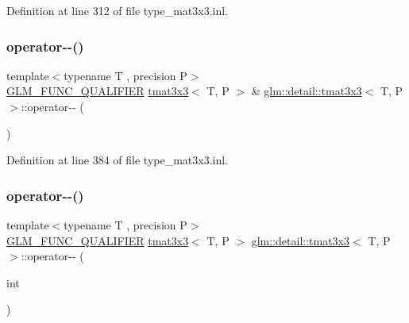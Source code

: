 Definition at line 312 of file type\+\_\+mat3x3.\+inl.

\mbox{\label{structglm_1_1detail_1_1tmat3x3_a00ca964c42c36a5472103aa3a9b375fc}} 
\subsubsection{\texorpdfstring{operator-\/-\/()}{operator--()}\hspace{0.1cm}{\footnotesize\ttfamily [1/2]}}
{\footnotesize\ttfamily template$<$typename T , precision P$>$ \\
\hyperlink{setup_8hpp_a33fdea6f91c5f834105f7415e2a64407}{G\+L\+M\+\_\+\+F\+U\+N\+C\+\_\+\+Q\+U\+A\+L\+I\+F\+I\+ER} \hyperlink{structglm_1_1detail_1_1tmat3x3}{tmat3x3}$<$ T, P $>$ \& \hyperlink{structglm_1_1detail_1_1tmat3x3}{glm\+::detail\+::tmat3x3}$<$ T, P $>$\+::operator-\/-\/ (\begin{DoxyParamCaption}{ }\end{DoxyParamCaption})}



Definition at line 384 of file type\+\_\+mat3x3.\+inl.

\mbox{\label{structglm_1_1detail_1_1tmat3x3_a9a9c2ddae87b15a9a7d7000dcd41e27a}} 
\subsubsection{\texorpdfstring{operator-\/-\/()}{operator--()}\hspace{0.1cm}{\footnotesize\ttfamily [2/2]}}
{\footnotesize\ttfamily template$<$typename T , precision P$>$ \\
\hyperlink{setup_8hpp_a33fdea6f91c5f834105f7415e2a64407}{G\+L\+M\+\_\+\+F\+U\+N\+C\+\_\+\+Q\+U\+A\+L\+I\+F\+I\+ER} \hyperlink{structglm_1_1detail_1_1tmat3x3}{tmat3x3}$<$ T, P $>$ \hyperlink{structglm_1_1detail_1_1tmat3x3}{glm\+::detail\+::tmat3x3}$<$ T, P $>$\+::operator-\/-\/ (\begin{DoxyParamCaption}\item[{int}]{ }\end{DoxyParamCaption})}



